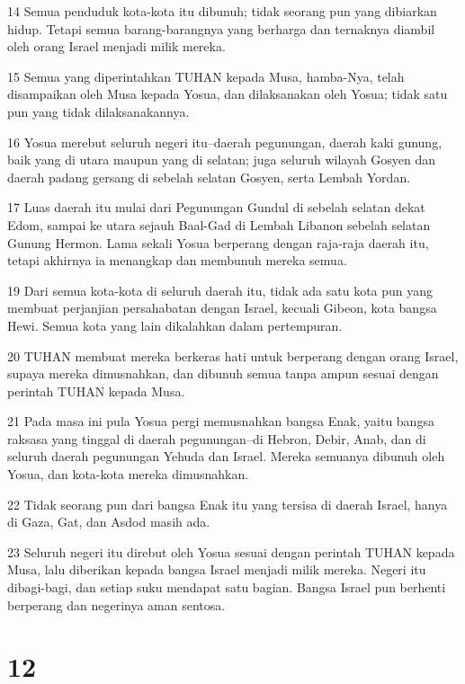 \par 14 Semua penduduk kota-kota itu dibunuh; tidak seorang pun yang dibiarkan hidup. Tetapi semua barang-barangnya yang berharga dan ternaknya diambil oleh orang Israel menjadi milik mereka.
\par 15 Semua yang diperintahkan TUHAN kepada Musa, hamba-Nya, telah disampaikan oleh Musa kepada Yosua, dan dilaksanakan oleh Yosua; tidak satu pun yang tidak dilaksanakannya.
\par 16 Yosua merebut seluruh negeri itu--daerah pegunungan, daerah kaki gunung, baik yang di utara maupun yang di selatan; juga seluruh wilayah Gosyen dan daerah padang gersang di sebelah selatan Gosyen, serta Lembah Yordan.
\par 17 Luas daerah itu mulai dari Pegunungan Gundul di sebelah selatan dekat Edom, sampai ke utara sejauh Baal-Gad di Lembah Libanon sebelah selatan Gunung Hermon. Lama sekali Yosua berperang dengan raja-raja daerah itu, tetapi akhirnya ia menangkap dan membunuh mereka semua.
\par 19 Dari semua kota-kota di seluruh daerah itu, tidak ada satu kota pun yang membuat perjanjian persahabatan dengan Israel, kecuali Gibeon, kota bangsa Hewi. Semua kota yang lain dikalahkan dalam pertempuran.
\par 20 TUHAN membuat mereka berkeras hati untuk berperang dengan orang Israel, supaya mereka dimusnahkan, dan dibunuh semua tanpa ampun sesuai dengan perintah TUHAN kepada Musa.
\par 21 Pada masa ini pula Yosua pergi memusnahkan bangsa Enak, yaitu bangsa raksasa yang tinggal di daerah pegunungan--di Hebron, Debir, Anab, dan di seluruh daerah pegunungan Yehuda dan Israel. Mereka semuanya dibunuh oleh Yosua, dan kota-kota mereka dimusnahkan.
\par 22 Tidak seorang pun dari bangsa Enak itu yang tersisa di daerah Israel, hanya di Gaza, Gat, dan Asdod masih ada.
\par 23 Seluruh negeri itu direbut oleh Yosua sesuai dengan perintah TUHAN kepada Musa, lalu diberikan kepada bangsa Israel menjadi milik mereka. Negeri itu dibagi-bagi, dan setiap suku mendapat satu bagian. Bangsa Israel pun berhenti berperang dan negerinya aman sentosa.

\chapter{12}

